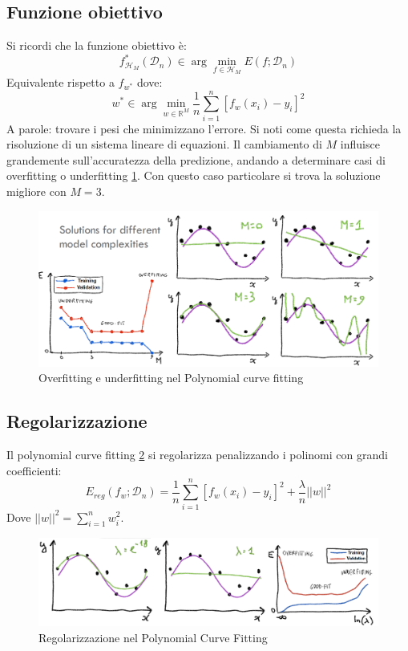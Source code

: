 	\subsection{Funzione obiettivo}
	Si ricordi che la funzione obiettivo \`e:
	$$f^*_{\mathcal{H}_M}(\mathcal{D}_n)\in\arg\min\limits_{f\in\mathcal{H}_M}E(f;\mathcal{D}_n)$$
	Equivalente rispetto a $f_{w^*}$ dove:
	$$w^*\in\arg\min\limits_{w\in\mathbb{R}^M}\frac{1}{n}\sum\limits_{i=1}^n[f_w(x_i)-y_i]^2$$
	A parole: trovare i pesi che minimizzano l'errore. 
	Si noti come questa richieda la risoluzione di un sistema lineare di equazioni.
	Il cambiamento di $M$ influisce grandemente sull'accuratezza della predizione, andando a determinare casi di overfitting o underfitting \ref{fig:chapter02-12}.
	Con questo caso particolare si trova la soluzione migliore con $M=3$.
	
	\begin{figure}
		\centering
		\includegraphics[width=0.6\linewidth]{imgs/chapter2/img12}
		\caption{Overfitting e underfitting nel Polynomial curve fitting}
		\label{fig:chapter02-12}
	\end{figure}
	
	\subsection{Regolarizzazione}
	Il polynomial curve fitting \ref{fig:chapter02-8} si regolarizza penalizzando i polinomi con grandi coefficienti:
	$$E_{reg}(f_w;\mathcal{D}_n) = \frac{1}{n}\sum\limits_{i=1}^n[f_w(x_i)-y_i]^2 + \frac{\lambda}{n}||w||^2$$
	Dove $||w||^2 = \sum\limits_{i = 1}^n w_i^2$.
	
	\begin{figure}
		\centering
		\includegraphics[width=0.6\linewidth]{imgs/chapter2/img8}
		\caption{Regolarizzazione nel Polynomial Curve Fitting}
		\label{fig:chapter02-8}
	\end{figure}
